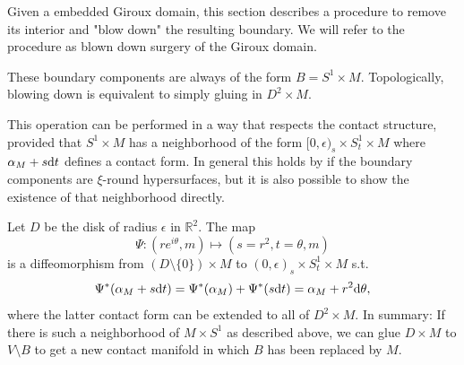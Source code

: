 Given a embedded Giroux domain, this section describes a procedure
to remove its interior and "blow down" the resulting boundary.
We will refer to the procedure as blown down surgery of the Giroux domain.

These boundary components are always of the form $B = S^1 \times M$.
Topologically, blowing down is equivalent to simply gluing in $D^2 \times M$.

This operation can be performed in a way that respects the contact structure,
provided that $S^1 \times M$ has a neighborhood
of the form $[0, \epsilon)_s \times S^1_t \times M$ where $\alpha_M + s \mathrm{d} t$
defines a contact form.
In general this holds by \cite[Lemma 5.1]{MNW13} if the boundary components 
are $\xi$-round hypersurfaces, but it is also possible to show the existence 
of that neighborhood directly.

Let $D$ be the disk of radius $\epsilon$ in $\mathbb R^2$. The map 
\[
    \Psi \colon (re^{i\theta} , m) \mapsto (s = r^2, t = \theta, m)
\]
is a diffeomorphism from $(D \setminus \{0\}) \times M$ to 
$(0, \epsilon)_s \times S^1_t \times M$ s.t.
\[
    \Psi^*(\alpha_M + s \mathrm{d} t) = \Psi^*(\alpha_M) + \Psi^*(s\mathrm{d} t) 
    = \alpha_M + r^2 \mathrm{d} \theta,
\]
where the latter contact form can be extended to all of $D^2 \times M$.
In summary: If there is such a neighborhood of $M \times S^1$ as described above, 
we can glue $D \times M$ to $V \setminus B$ to get a new contact manifold 
in which $B$ has been replaced by $M$.

